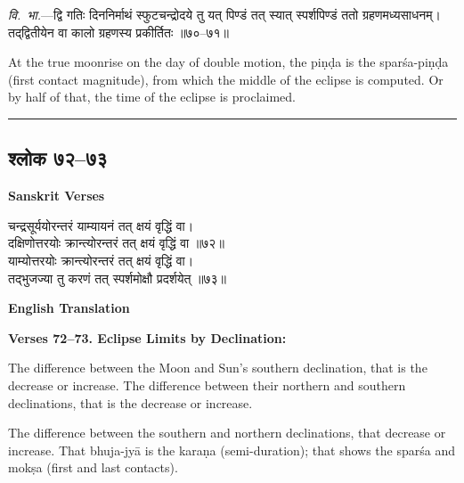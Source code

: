 \documentclass[11pt,a4paper]{article}
\newcommand{\longline}{\noindent\rule{\textwidth}{0.4pt}}
\newcommand{\dev}[1]{{\devanagarifont #1}}
\newcommand{\sectsep}{\par\vspace{0.8em}\longline\vspace{0.8em}}
\begin{document}
\vspace{0.5em}
\begin{minipage}[t]{0.48\textwidth}
\small\devanagarifont
\textit{वि.~भा.}---द्वि गतिः दिननिर्माथं स्फुटचन्द्रोदये तु यत् पिण्डं तत् स्यात् स्पर्शपिण्डं ततो ग्रहणमध्यसाधनम्। तद्‌द्वितीयेन वा कालो ग्रहणस्य प्रकीर्तितः ॥७०--७१॥
\end{minipage}%
\hfill
\begin{minipage}[t]{0.48\textwidth}
\small
At the true moonrise on the day of double motion, the pi\d{n}\d{d}a is the spar\'sa-pi\d{n}\d{d}a (first contact magnitude), from which the middle of the eclipse is computed. Or by half of that, the time of the eclipse is proclaimed.
\end{minipage}

\sectsep

\subsection{\dev{श्लोक ७२--७३}}

\begin{minipage}[t]{0.48\textwidth}
\textbf{\small Sanskrit Verses}

\small\devanagarifont
चन्द्रसूर्ययोरन्तरं याम्यायनं तत् क्षयं वृद्धिं वा।\\
दक्षिणोत्तरयोः क्रान्त्योरन्तरं तत् क्षयं वृद्धिं वा ॥७२॥\\[0.5em]
याम्योत्तरयोः क्रान्त्योरन्तरं तत् क्षयं वृद्धिं वा।\\
तद्‌भुजज्या तु करणं तत् स्पर्शमोक्षौ प्रदर्शयेत् ॥७३॥
\end{minipage}%
\hfill
\begin{minipage}[t]{0.48\textwidth}
\textbf{\small English Translation}

\textbf{Verses 72--73. Eclipse Limits by Declination:}

The difference between the Moon and Sun's southern declination, that is the decrease or increase. The difference between their northern and southern declinations, that is the decrease or increase.

The difference between the southern and northern declinations, that decrease or increase. That bhuja-jy\=a is the kara\d{n}a (semi-duration); that shows the spar\'sa and mok\d{s}a (first and last contacts).
\end{minipage}
\end{document}
